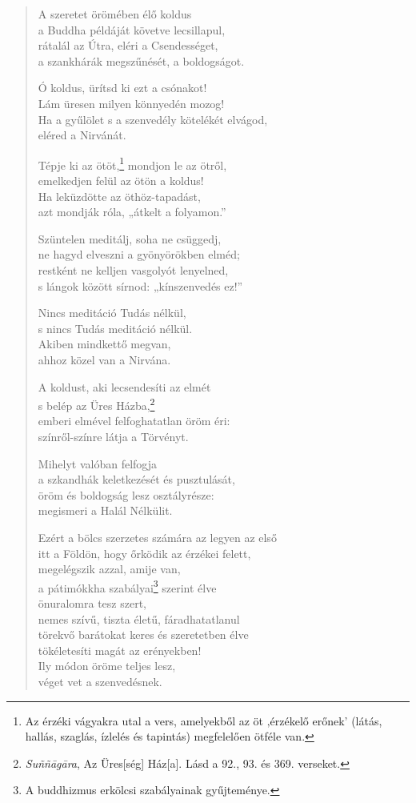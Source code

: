 \begin{verse}
 A szeretet örömében élő koldus\\
a Buddha példáját követve lecsillapul,\\
rátalál az Útra, eléri a Csendességet,\\
a szankhárák megszűnését, a boldogságot.

 Ó koldus, ürítsd ki ezt a csónakot!\\
Lám üresen milyen könnyedén mozog!\\
Ha a gyűlölet s a szenvedély kötelékét elvágod,\\
eléred a Nirvánát.

 Tépje ki az ötöt,\footnote{Az érzéki vágyakra utal a vers, amelyekből az öt ‚érzékelő erőnek’ (látás, hallás, szaglás, ízlelés és tapintás) megfelelően ötféle van.} mondjon le az ötről,\\
emelkedjen felül az ötön a koldus!\\
Ha leküzdötte az öthöz-tapadást,\\
azt mondják róla, „átkelt a folyamon.”

 Szüntelen meditálj, soha ne csüggedj,\\
ne hagyd elveszni a gyönyörökben elméd;\\
restként ne kelljen vasgolyót lenyelned,\\
s lángok között sírnod: „kínszenvedés ez!”

 Nincs meditáció Tudás nélkül,\\
s nincs Tudás meditáció nélkül.\\
Akiben mindkettő megvan,\\
ahhoz közel van a Nirvána.

 A koldust, aki lecsendesíti az elmét\\
s belép az Üres Házba,\footnote{\textit{Su\~n\~n\=ag\=ara}, Az Üres[ség] Ház[a]. Lásd a 92., 93. és 369. verseket.}\\
emberi elmével felfoghatatlan öröm éri:\\
színről-színre látja a Törvényt.

 Mihelyt valóban felfogja\\
a szkandhák keletkezését és pusztulását,\\
öröm és boldogság lesz osztályrésze:\\
megismeri a Halál Nélkülit.

 Ezért a bölcs szerzetes számára az legyen az első\\
itt a Földön, hogy őrködik az érzékei felett,\\
megelégszik azzal, amije van,\\
a pátimókkha szabályai\footnote{A buddhizmus erkölcsi szabályainak gyűjteménye.} szerint élve\\
önuralomra tesz szert,\\
nemes szívű, tiszta életű, fáradhatatlanul\\
törekvő barátokat keres és szeretetben élve\\
tökéletesíti magát az erényekben!\\
Ily módon öröme teljes lesz,\\
véget vet a szenvedésnek.


\end{verse}
